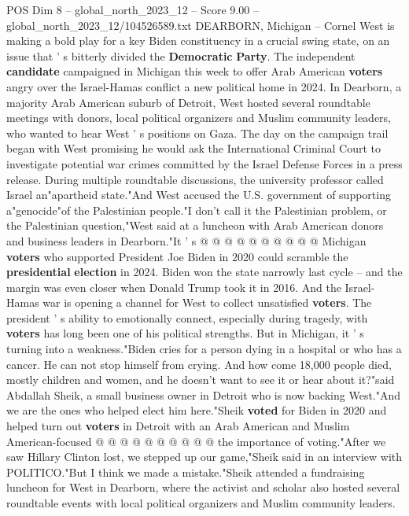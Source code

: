 \begin{textsample}{POS Dim 8 – global\_north\_2023\_12 – Score 9.00 – global\_north\_2023\_12/104526589.txt}  \label{ex:f8_pos_117}
DEARBORN, Michigan -- Cornel West is making a bold play for a key Biden constituency in a crucial swing state, on an issue that ' s bitterly divided the \textbf{Democratic} \textbf{Party}.
The independent \textbf{candidate} campaigned in Michigan this week to offer Arab American \textbf{voters} angry over the Israel-Hamas conflict a new political home in 2024.
In Dearborn, a majority Arab American suburb of Detroit, West hosted several roundtable meetings with donors, local political organizers and Muslim community leaders, who wanted to hear West ' s positions on Gaza.
The day on the campaign trail began with West promising he would ask the International Criminal Court to investigate potential war crimes committed by the Israel Defense Forces in a press release.
During multiple roundtable discussions, the university professor called Israel an"apartheid state."And West accused the U.S. government of supporting a"genocide"of the Palestinian people."I don't call it the Palestinian problem, or the Palestinian question,"West said at a luncheon with Arab American donors and business leaders in Dearborn."It ' s @ @ @ @ @ @ @ @ @ @ Michigan \textbf{voters} who supported President Joe Biden in 2020 could scramble the \textbf{presidential} \textbf{election} in 2024.
Biden won the state narrowly last cycle -- and the margin was even closer when Donald Trump took it in 2016.
And the Israel-Hamas war is opening a channel for West to collect unsatisfied \textbf{voters}.
The president ' s ability to emotionally connect, especially during tragedy, with \textbf{voters} has long been one of his political strengths.
But in Michigan, it ' s turning into a weakness."Biden cries for a person dying in a hospital or who has a cancer.
He can not stop himself from crying.
And how come 18,000 people died, mostly children and women, and he doesn't want to see it or hear about it?"said Abdallah Sheik, a small business owner in Detroit who is now backing West."And we are the ones who helped elect him here."Sheik \textbf{voted} for Biden in 2020 and helped turn out \textbf{voters} in Detroit with an Arab American and Muslim American-focused @ @ @ @ @ @ @ @ @ @ the importance of voting."After we saw Hillary Clinton lost, we stepped up our game,"Sheik said in an interview with POLITICO."But I think we made a mistake."Sheik attended a fundraising luncheon for West in Dearborn, where the activist and scholar also hosted several roundtable events with local political organizers and Muslim community leaders.

\end{textsample}
